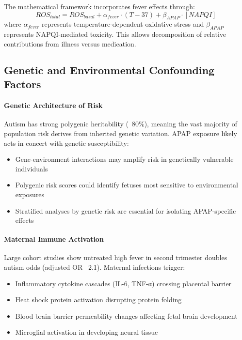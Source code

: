 \documentclass[11pt]{article}
\let\oldsubsection\subsection
\renewcommand{\subsection}[1]{\oldsubsection{#1}\setlength{\leftskip}{0.75em}}
\begin{document}
The mathematical framework incorporates fever effects through:
\begin{equation}
ROS_{total} = ROS_{basal} + \alpha_{fever} \cdot (T - 37) + \beta_{APAP} \cdot [NAPQI]
\end{equation}
where $\alpha_{fever}$ represents temperature-dependent oxidative stress and $\beta_{APAP}$ represents NAPQI-mediated toxicity. This allows decomposition of relative contributions from illness versus medication.

\subsection{Genetic and Environmental Confounding Factors}

\paragraph{Genetic Architecture of Risk}
Autism has strong polygenic heritability (~80\%), meaning the vast majority of population risk derives from inherited genetic variation. APAP exposure likely acts in concert with genetic susceptibility:
\begin{itemize}
\item Gene-environment interactions may amplify risk in genetically vulnerable individuals
\item Polygenic risk scores could identify fetuses most sensitive to environmental exposures
\item Stratified analyses by genetic risk are essential for isolating APAP-specific effects
\end{itemize}

\paragraph{Maternal Immune Activation}
Large cohort studies show untreated high fever in second trimester doubles autism odds (adjusted OR ~2.1). Maternal infections trigger:
\begin{itemize}
\item Inflammatory cytokine cascades (IL-6, TNF-α) crossing placental barrier
\item Heat shock protein activation disrupting protein folding
\item Blood-brain barrier permeability changes affecting fetal brain development
\item Microglial activation in developing neural tissue
\end{itemize}
\end{document}
